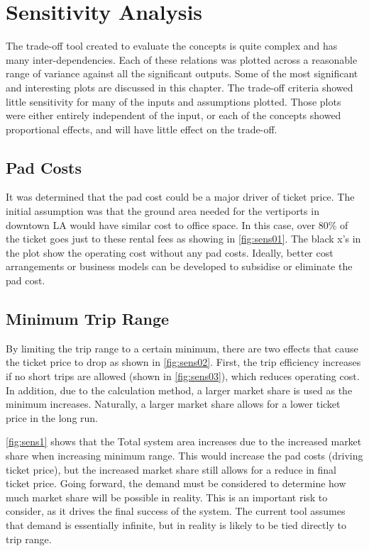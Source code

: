 \newpage
\chapter{Sensitivity Analysis} \label{ch:sensitivity}

The trade-off tool created to evaluate the concepts is quite complex and has many inter-dependencies. Each of these relations was plotted across a reasonable range of variance against all the significant outputs. Some of the most significant and interesting plots are discussed in this chapter. The trade-off criteria showed little sensitivity for many of the inputs and assumptions plotted. Those plots were either entirely independent of the input, or each of the concepts showed proportional effects, and will have little effect on the trade-off.

\section{Pad Costs}
It was determined that the pad cost could be a major driver of ticket price. The initial assumption was that the ground area needed for the vertiports in downtown LA would have similar cost to office space. In this case, over 80\% of the ticket goes just to these rental fees as showing in \autoref{fig:sens01}. The black x's in the plot show the operating cost without any pad costs. Ideally, better cost arrangements or business models can be developed to subsidise or eliminate the pad cost.

\section{Minimum Trip Range}
By limiting the trip range to a certain minimum, there are two effects that cause the ticket price to drop as shown in \autoref{fig:sens02}. First, the trip efficiency increases if no short trips are allowed (shown in \autoref{fig:sens03}), which reduces operating cost. In addition, due to the calculation method, a larger market share is used as the minimum increases. Naturally, a larger market share allows for a lower ticket price in the long run. 

\autoref{fig:sens1} shows that the Total system area increases due to the increased market share when increasing minimum range. This would increase the pad costs (driving ticket price), but the increased market share still allows for a reduce in final ticket price. Going forward, the demand must be considered to determine how much market share will be possible in reality. This is an important risk to consider, as it drives the final success of the system. The current tool assumes that demand is essentially infinite, but in reality is likely to be tied directly to trip range.

